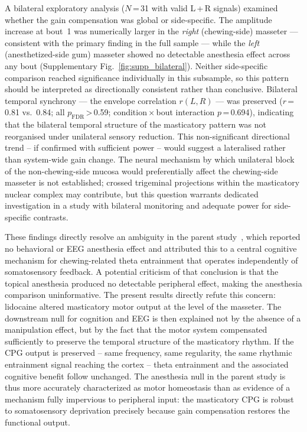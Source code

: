A bilateral exploratory analysis ($N$\,=\,31 with valid L\,+\,R signals)
examined whether the gain compensation was global or side-specific.
The amplitude increase at bout~1 was numerically larger in the
\emph{right} (chewing-side) masseter --- consistent with the primary
finding in the full sample --- while the \emph{left} (anesthetized-side gum)
masseter showed no detectable anesthesia effect across any bout
(Supplementary Fig.~\ref{fig:supp_bilateral}).
Neither side-specific comparison reached significance individually in
this subsample, so this pattern should be interpreted as directionally
consistent rather than conclusive.
Bilateral temporal synchrony --- the envelope correlation $r(L,R)$ ---
was preserved ($r$\,=\,0.81 vs.\ 0.84; all $p_{\text{FDR}}$\,>\,0.59;
condition\,$\times$\,bout interaction $p$\,=\,0.694), indicating that
the bilateral temporal structure of the masticatory pattern was not
reorganised under unilateral sensory reduction.
This non-significant directional trend -- if confirmed with sufficient
power -- would suggest a lateralised rather than system-wide gain change.
The neural mechanism by which unilateral block of the non-chewing-side mucosa
would preferentially affect the chewing-side masseter is not established;
crossed trigeminal projections within the masticatory nuclear complex may
contribute, but this question warrants dedicated investigation in a study
with bilateral monitoring and adequate power for side-specific contrasts.

These findings directly resolve an ambiguity in the parent study~\cite{espinoza2025},
which reported no behavioral or EEG anesthesia effect and attributed this to
a central cognitive mechanism for chewing-related theta entrainment that
operates independently of somatosensory feedback.
A potential criticism of that conclusion is that the topical anesthesia
produced no detectable peripheral effect, making the anesthesia comparison
uninformative.
The present results directly refute this concern: lidocaine altered masticatory
motor output at the level of the masseter.
The downstream null for cognition and EEG is then explained not by the absence
of a manipulation effect, but by the fact that the motor system compensated
sufficiently to preserve the temporal structure of the masticatory rhythm.
If the CPG output is preserved -- same frequency, same regularity, the same
rhythmic entrainment signal reaching the cortex -- theta entrainment and
the associated cognitive benefit follow unchanged.
The anesthesia null in the parent study is thus more accurately characterized
as motor homeostasis than as evidence of a mechanism fully impervious to
peripheral input: the masticatory CPG is robust to somatosensory deprivation
precisely because gain compensation restores the functional output.

